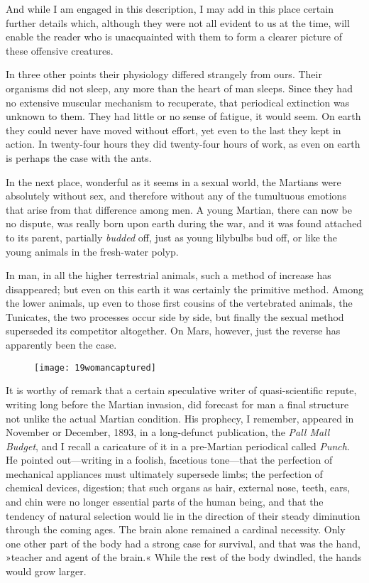 And while I am engaged in this description, I may add in this place certain further details which, although they were not all evident to us at the time, will enable the reader who is unacquainted with them to form a clearer picture of these offensive creatures.

In three other points their physiology differed strangely from ours. Their organisms did not sleep, any more than the heart of man sleeps. Since they had no extensive muscular mechanism to recuperate, that periodical extinction was unknown to them. They had little or no sense of fatigue, it would seem. On earth they could never have moved without effort, yet even to the last they kept in action. In twenty-four hours they did twenty-four hours of work, as even on earth is perhaps the case with the ants.

In the next place, wonderful as it seems in a sexual world, the Martians were absolutely without sex, and therefore without any of the tumultuous emotions that arise from that difference among men. A young Martian, there can now be no dispute, was really born upon earth during the war, and it was found attached to its parent, partially \textit{budded} off, just as young lilybulbs bud off, or like the young animals in the fresh-water polyp.

In man, in all the higher terrestrial animals, such a method of increase has disappeared; but even on this earth it was certainly the primitive method. Among the lower animals, up even to those first cousins of the vertebrated animals, the Tunicates, the two processes occur side by side, but finally the sexual method superseded its competitor altogether. On Mars, however, just the reverse has apparently been the case.


\begin{figure}[tb!]
\centering
\texttt{[image: 19womancaptured]}
\end{figure}


It is worthy of remark that a certain speculative writer of quasi-scientific repute, writing long before the Martian invasion, did forecast for man a final structure not unlike the actual Martian condition. His prophecy, I remember, appeared in November or December, 1893, in a long-defunct publication, the \textit{Pall Mall Budget}, and I recall a caricature of it in a pre-Martian periodical called \textit{Punch}. He pointed out—writing in a foolish, facetious tone—that the perfection of mechanical appliances must ultimately supersede limbs; the perfection of chemical devices, digestion; that such organs as hair, external nose, teeth, ears, and chin were no longer essential parts of the human being, and that the tendency of natural selection would lie in the direction of their steady diminution through the coming ages. The brain alone remained a cardinal necessity. Only one other part of the body had a strong case for survival, and that was the hand, »teacher and agent of the brain.« While the rest of the body dwindled, the hands would grow larger.

